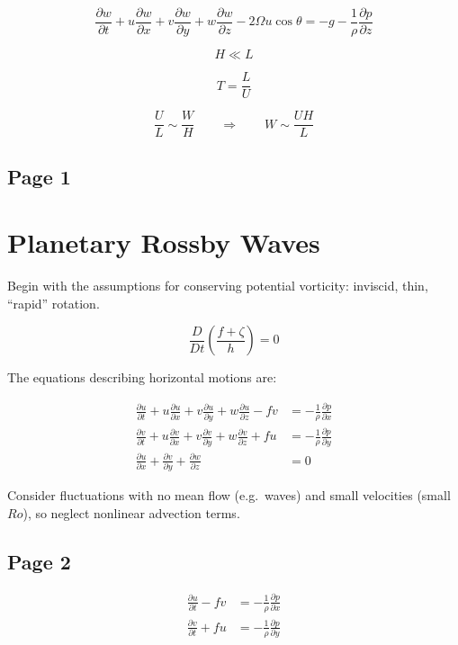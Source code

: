 \documentclass[11pt]{article}
\begin{document}
\[
    \frac{\partial w}{\partial t}
    +u\frac{\partial w}{\partial x}
    +v\frac{\partial w}{\partial y}
    +w\frac{\partial w}{\partial z}
    -2\Omega u\cos\theta
    =
    -g-\frac{1}{\rho}\frac{\partial p}{\partial z}
\]

\[
    H \ll L
\]

\[
    T=\frac{L}{U}
\]

\[
    \frac{U}{L}\sim\frac{W}{H}
    \qquad\Rightarrow\qquad
    W\sim \frac{UH}{L}
\]


\subsection*{Page 1}
\section*{Planetary Rossby Waves}

Begin with the assumptions for conserving potential vorticity: inviscid, thin, ``rapid'' rotation.

\[
\frac{D}{Dt}\left(\frac{f+\zeta}{h}\right)=0
\]

The equations describing horizontal motions are:

\begin{align}
\frac{\partial u}{\partial t}
+u\frac{\partial u}{\partial x}
+v\frac{\partial u}{\partial y}
+w\frac{\partial u}{\partial z}
-fv
&=
-\frac{1}{\rho}\frac{\partial p}{\partial x}
\tag{1}\\[6pt]
\frac{\partial v}{\partial t}
+u\frac{\partial v}{\partial x}
+v\frac{\partial v}{\partial y}
+w\frac{\partial v}{\partial z}
+fu
&=
-\frac{1}{\rho}\frac{\partial p}{\partial y}
\tag{2}\\[6pt]
\frac{\partial u}{\partial x}
+\frac{\partial v}{\partial y}
+\frac{\partial w}{\partial z}
&=0
\tag{3}
\end{align}

Consider fluctuations with no mean flow (e.g.\ waves) and small velocities
(small $Ro$), so neglect nonlinear advection terms.

\subsection*{Page 2}
\begin{align}
\frac{\partial u}{\partial t}-fv
&=
-\frac{1}{\rho}\frac{\partial p}{\partial x}
\tag{1}\\[6pt]
\frac{\partial v}{\partial t}+fu
&=
-\frac{1}{\rho}\frac{\partial p}{\partial y}
\tag{2}
\end{align}
\end{document}
